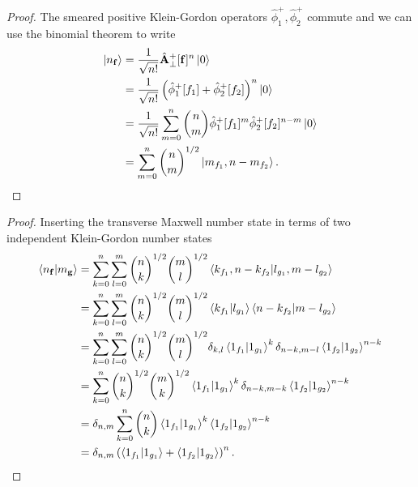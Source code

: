 \qmwqkgnumberstate
\begin{proof}
	The smeared positive Klein-Gordon operators $\hat\phi^+_1,\hat\phi^+_2$ commute and we can use the binomial theorem to write
	\begin{equation*}
		\begin{split}
			\ket{n_{\vb{f}}}
			&=
			\frac{1}{\sqrt{n!}}
			\hat{\vb{A}}_\perp^+[\vb{f}]^n
			\ket{0}
			\\
			&=
			\frac{1}{\sqrt{n!}}
			\left(
				\hat\phi_1^+[f_1]
				+
				\hat\phi_2^+[f_2]
			\right)^n
			\ket{0}
			\\
			&=
			\frac{1}{\sqrt{n!}}
			\sum^n_{m=0}
			\binom{n}{m}
			\hat\phi_1^+[f_1]^m
			\hat\phi_2^+[f_2]^{n-m}
			\ket{0}
			\\
			&=
			\sum^n_{m=0}
			\binom{n}{m}^{1/2}
			\ket{m_{f_1},n-m_{f_2}}
			.
		\end{split}
	\end{equation*}
\end{proof}
\qmwqkgnumberstateinnerproduct
\begin{proof}
	Inserting the transverse Maxwell number state in terms of two independent Klein-Gordon number states 
	\begin{equation*}
		\begin{split}
			\braket{n_{\vb{f}}}{m_{\vb{g}}}
			&=
			\sum^n_{k=0}
			\sum^m_{l=0}
			\binom{n}{k}^{1/2}
			\binom{m}{l}^{1/2}
			\braket{k_{f_1},n-k_{f_2}}{l_{g_1},m-l_{g_2}}
			\\
			&=
			\sum^n_{k=0}
			\sum^m_{l=0}
			\binom{n}{k}^{1/2}
			\binom{m}{l}^{1/2}
			\braket{k_{f_1}}{l_{g_1}}
			\braket{n-k_{f_2}}{m-l_{g_2}}
			\\
			&=
			\sum^n_{k=0}
			\sum^m_{l=0}
			\binom{n}{k}^{1/2}
			\binom{m}{l}^{1/2}
			\delta_{k,l}
			\braket{1_{f_1}}{1_{g_1}}^k
			\delta_{n-k,m-l}
			\braket{1_{f_2}}{1_{g_2}}^{n-k}
			\\
			&=
			\sum^n_{k=0}
			\binom{n}{k}^{1/2}
			\binom{m}{k}^{1/2}
			\braket{1_{f_1}}{1_{g_1}}^k
			\delta_{n-k,m-k}
			\braket{1_{f_2}}{1_{g_2}}^{n-k}
			\\
			&=
			\delta_{n,m}
			\sum^n_{k=0}
			\binom{n}{k}
			\braket{1_{f_1}}{1_{g_1}}^k
			\braket{1_{f_2}}{1_{g_2}}^{n-k}
			\\
			&=
			\delta_{n,m}
			\left(
				\braket{1_{f_1}}{1_{g_1}}
				+
				\braket{1_{f_2}}{1_{g_2}}
			\right)^n
			.
		\end{split}
	\end{equation*}
\end{proof}

